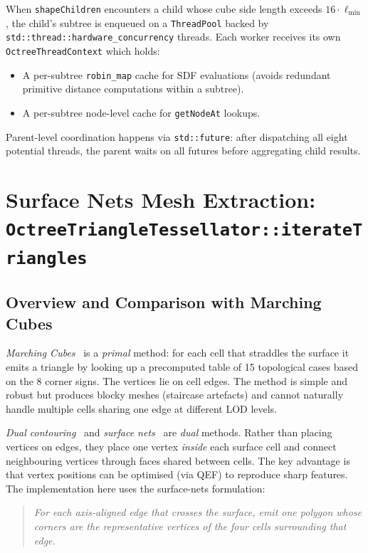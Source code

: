 \documentclass[10pt,a4paper]{article}
\begin{document}
When \lstinline{shapeChildren} encounters a child whose cube side length
exceeds $16 \cdot \ell_{\min}$, the child's subtree is enqueued on a
\lstinline{ThreadPool} backed by \lstinline{std::thread::hardware_concurrency}
threads.  Each worker receives its own \lstinline{OctreeThreadContext} which
holds:
\begin{itemize}
  \item A per-subtree \lstinline{robin_map} cache for SDF evaluations
    (avoids redundant primitive distance computations within a subtree).
  \item A per-subtree node-level cache for \lstinline{getNodeAt} lookups.
\end{itemize}
Parent-level coordination happens via \lstinline{std::future}: after
dispatching all eight potential threads, the parent waits on all futures
before aggregating child results.

\section{Surface Nets Mesh Extraction: \texttt{OctreeTriangleTessellator::iterateTriangles}}
\label{sec:itriangles}

\subsection{Overview and Comparison with Marching Cubes}

\emph{Marching Cubes}~\cite{lorensen87} is a \emph{primal} method: for
each cell that straddles the surface it emits a triangle by looking up a
precomputed table of 15 topological cases based on the 8 corner signs.
The vertices lie on cell edges.  The method is simple and robust but
produces blocky meshes (staircase artefacts) and cannot naturally handle
multiple cells sharing one edge at different LOD levels.

\emph{Dual contouring}~\cite{ju02} and \emph{surface nets}~\cite{gibson98}
are \emph{dual} methods.  Rather than placing vertices on edges, they
place one vertex \emph{inside} each surface cell and connect neighbouring
vertices through faces shared between cells.  The key advantage is that
vertex positions can be optimised (via QEF) to reproduce sharp
features.  The implementation here uses the surface-nets formulation:

\begin{quote}
  \emph{For each axis-aligned edge that crosses the surface, emit one
  polygon whose corners are the representative vertices of the four
  cells surrounding that edge.}
\end{quote}
\end{document}
